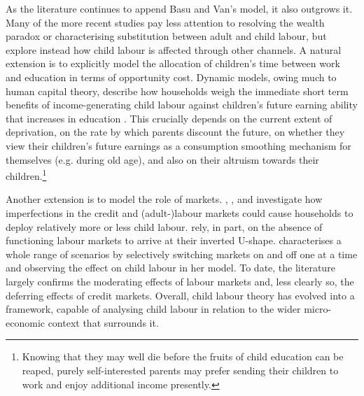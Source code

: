 \documentclass[a4paper,12pt]{article}
\theoremstyle{plain}
\theoremstyle{definition}
\theoremstyle{definition}
\theoremstyle{definition}
\theoremstyle{definition}
\begin{document}
As the literature continues to append Basu and Van's model, it also outgrows it. Many of the more recent studies pay less attention to resolving the wealth paradox or characterising substitution between adult and child labour, but explore instead how child labour is affected through other channels. A natural extension is to explicitly model the allocation of children's time between work and education in terms of opportunity cost. Dynamic models, owing much to human capital theory, describe how households weigh the immediate short term benefits of income-generating child labour against  children's future earning ability that increases in education \citep[see e.g.][]{Bar2009,Pal2012,Dendir2014, Edmonds2014,Chakraborty2018}. This crucially depends on the current extent of deprivation, on the rate by which parents discount the future, on whether they view their children's future earnings as a consumption smoothing mechanism for themselves (e.g. during old age), and also on their altruism towards their children.\footnote{Knowing that they may well die before the fruits of child education can be reaped, purely self-interested parents may prefer sending their children to work and enjoy additional income presently.}

Another extension is to model the role of markets. \citet{Baland2000}, \citet{Bhalotra2003}, and \citet{Dumas2007}  investigate how imperfections in the credit and (adult-)labour markets could cause households to deploy relatively more or less child labour. \citet{Basu2010} rely, in part, on the absence of functioning labour markets to arrive at their inverted U-shape. \citet{Dumas2013,Dumas2015,Dumas2020} characterises a whole range of scenarios by selectively switching markets on and off one at a time and observing the effect on child labour in her model. To date, the literature largely confirms the moderating effects of labour markets and, less clearly so, the deferring effects of credit markets. Overall, child labour theory has evolved into a framework, capable of analysing child labour in relation to the wider micro-economic context that surrounds it.
\end{document}
